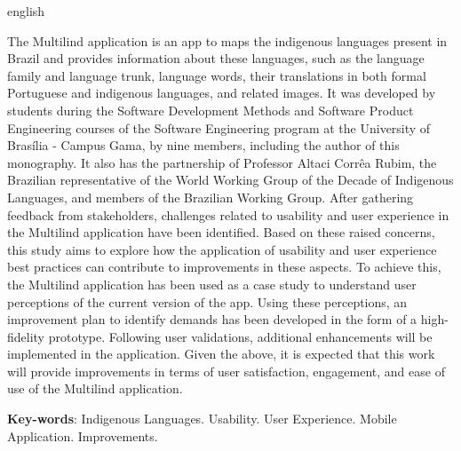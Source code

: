\begin{resumo}[Abstract]
 \begin{otherlanguage*}{english}
   
  The Multilind application is an app to maps the indigenous languages present in Brazil and provides information about these languages, such as the language family and 
  language trunk, language words, their translations in both formal Portuguese and indigenous languages, and related images. It was developed by students during the Software Development Methods and Software Product Engineering courses of the Software Engineering program at the University of Brasília - Campus Gama, 
  by nine members, including the author of this monography. It also has the partnership of Professor Altaci Corrêa Rubim, the Brazilian representative of the World Working Group of the Decade 
  of Indigenous Languages, and members of the Brazilian Working Group. After gathering feedback from stakeholders, challenges related to usability and user experience 
  in the Multilind application have been identified. Based on these raised concerns, this study aims to explore how the application of usability and user experience best practices can contribute to improvements in these aspects. 
  To achieve this, the Multilind application has been used as a case study to understand user perceptions of the current version of the app. Using these perceptions, an improvement plan to identify demands has been developed 
  in the form of a high-fidelity prototype. Following user validations, additional enhancements will be implemented in the application. Given the above, it is expected 
  that this work will provide improvements in terms of user satisfaction, engagement, and ease of use of the Multilind application.

   \vspace{\onelineskip}
 
   \noindent 
   \textbf{Key-words}: Indigenous Languages. Usability. User Experience. Mobile Application. Improvements.
 \end{otherlanguage*}
\end{resumo}
